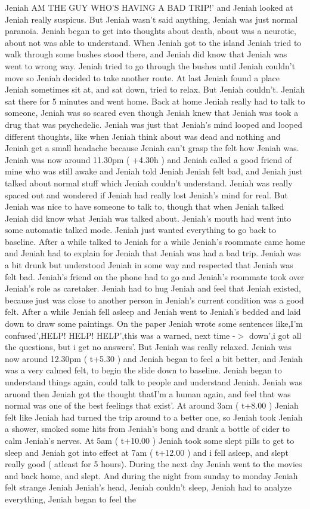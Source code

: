 \documentclass[12pt]{book}
\begin{document}
Jeniah AM THE GUY WHO'S HAVING A BAD TRIP!' and Jeniah looked at Jeniah really suspicus. But Jeniah wasn't said anything, Jeniah was just normal paranoia. Jeniah began to get into thoughts about death, about was a neurotic, about not was able to understand. When Jeniah got to the island Jeniah tried to walk through some bushes stood there, and Jeniah did know that Jeniah was went to wrong way. Jeniah tried to go through the bushes until Jeniah couldn't move so Jeniah decided to take another route. At last Jeniah found a place Jeniah sometimes sit at, and sat down, tried to relax. But Jeniah couldn't. Jeniah sat there for 5 minutes and went home. Back at home Jeniah really had to talk to someone, Jeniah was so scared even though Jeniah knew that Jeniah was took a drug that was psychedelic. Jeniah was just that Jeniah's mind looped and looped different thoughts, like when Jeniah think about was dead and nothing and Jeniah get a small headache because Jeniah can't grasp the felt how Jeniah was. Jeniah was now around 11.30pm ( +4.30h ) and Jeniah called a good friend of mine who was still awake and Jeniah told Jeniah Jeniah felt bad, and Jeniah just talked about normal stuff which Jeniah couldn't understand. Jeniah was really spaced out and wondered if Jeniah had really lost Jeniah's mind for real. But Jeniah was nice to have someone to talk to, though that when Jeniah talked Jeniah did know what Jeniah was talked about. Jeniah's mouth had went into some automatic talked mode. Jeniah just wanted everything to go back to baseline. After a while talked to Jeniah for a while Jeniah's roommate came home and Jeniah had to explain for Jeniah that Jeniah was had a bad trip. Jeniah was a bit drunk but understood Jeniah in some way and respected that Jeniah was felt bad. Jeniah's friend on the phone had to go and Jeniah's roommate took over Jeniah's role as caretaker. Jeniah had to hug Jeniah and feel that Jeniah existed, because just was close to another person in Jeniah's current condition was a good felt. After a while Jeniah fell asleep and Jeniah went to Jeniah's bedded and laid down to draw some paintings. On the paper Jeniah wrote some sentences like,I'm confused',HELP! HELP! HELP',this was a warned, next time -$>$ down',i got all the questions, but i get no answers'. But Jeniah was really relaxed. Jeniah was now around 12.30pm ( t+5.30 ) and Jeniah began to feel a bit better, and Jeniah was a very calmed felt, to begin the slide down to baseline. Jeniah began to understand things again, could talk to people and understand Jeniah. Jeniah was aruond then Jeniah got the thought thatI'm a human again, and feel that was normal was one of the best feelings that exist'. At around 3am ( t+8.00 ) Jeniah felt like Jeniah had turned the trip around to a better one, so Jeniah took Jeniah a shower, smoked some hits from Jeniah's bong and drank a bottle of cider to calm Jeniah's nerves. At 5am ( t+10.00 ) Jeniah took some slept pills to get to sleep and Jeniah got into effect at 7am ( t+12.00 ) and i fell asleep, and slept really good ( atleast for 5 hours). During the next day Jeniah went to the movies and back home, and slept. And during the night from sunday to monday Jeniah felt strange Jeniah Jeniah's head, Jeniah couldn't sleep, Jeniah had to analyze everything, Jeniah began to feel the 
\end{document}
